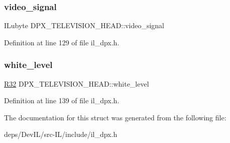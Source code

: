 \subsubsection{\texorpdfstring{video\+\_\+signal}{video\_signal}}
{\footnotesize\ttfamily I\+Lubyte D\+P\+X\+\_\+\+T\+E\+L\+E\+V\+I\+S\+I\+O\+N\+\_\+\+H\+E\+A\+D\+::video\+\_\+signal}



Definition at line 129 of file il\+\_\+dpx.\+h.

\mbox{\label{structDPX__TELEVISION__HEAD_a9efe6e2f439cec9ffe7091124108c6e6}} 
\subsubsection{\texorpdfstring{white\+\_\+level}{white\_level}}
{\footnotesize\ttfamily \hyperlink{structR32}{R32} D\+P\+X\+\_\+\+T\+E\+L\+E\+V\+I\+S\+I\+O\+N\+\_\+\+H\+E\+A\+D\+::white\+\_\+level}



Definition at line 139 of file il\+\_\+dpx.\+h.



The documentation for this struct was generated from the following file\+:\begin{DoxyCompactItemize}
\item 
deps/\+Dev\+I\+L/src-\/\+I\+L/include/il\+\_\+dpx.\+h\end{DoxyCompactItemize}
